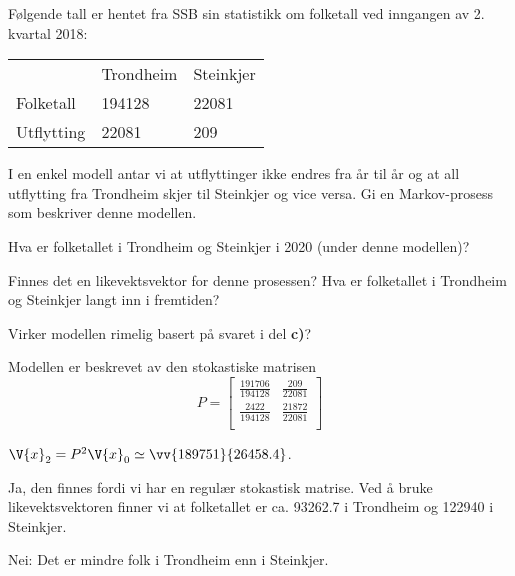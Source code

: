 \begin{oppgave}
Følgende tall er hentet fra SSB sin statistikk om folketall ved inngangen av 2. kvartal 2018:

\begin{table}[h]
\begin{tabular}{lll}
           & Trondheim & Steinkjer \\
Folketall & 194128    & 22081     \\
Utflytting & 22081     & 209      
\end{tabular}
\end{table}

\begin{punkt}
I en enkel modell antar vi at utflyttinger ikke endres fra år til år og at all utflytting fra Trondheim skjer til Steinkjer og vice versa. Gi en Markov-prosess som beskriver denne modellen.
\end{punkt}

\begin{punkt}
Hva er folketallet i Trondheim og Steinkjer i 2020 (under denne modellen)?
\end{punkt}

\begin{punkt}
Finnes det en likevektsvektor for denne prosessen? Hva er folketallet i Trondheim og Steinkjer langt inn i fremtiden?
\end{punkt}

\begin{punkt}
Virker modellen rimelig basert på svaret i del \textbf{c)}?
\end{punkt}

\end{oppgave}

\begin{losning}


\begin{punkt}
Modellen er beskrevet av den stokastiske matrisen $$P=\begin{bmatrix}
\frac{191706}{194128} & \frac{209}{22081}\\
\frac{2422}{194128} & \frac{21872}{22081}\\
\end{bmatrix}$$
\end{punkt}

\begin{punkt}
$\V{x}_2=P^2\V{x}_0\simeq \vv{189751}{26458.4}$.
\end{punkt}

\begin{punkt}
Ja, den finnes fordi vi har en regulær stokastisk matrise. Ved å bruke likevektsvektoren finner vi at folketallet er ca. 93262.7 i Trondheim og 122940 i Steinkjer.
\end{punkt}

\begin{punkt}
Nei: Det er mindre folk i Trondheim enn i Steinkjer.
\end{punkt}

\end{losning}

